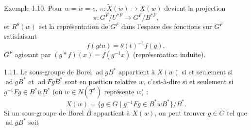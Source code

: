 \documentclass[9pt,twoside]{extarticle}
\begin{document}
{Exemple 1.10. Pour \(w=\dot w=e\), \(\pi:\widetilde X(\dot w)\to X(w)\) devient la projection \[
\pi:G^F/U^{*F}\longrightarrow G^F/B^{*F},
\] et \(R^\theta(w)\) est la représentation de \(G^F\) dans l'espace des fonctions sur \(G^F\) satisfaisant \[
f(gtu)=\theta(t)^{-1}f(g),
\]  \(G^F\) agissant par \((g*f)(x)=f(g^{-1}x)\) (représentation induite).\par

1.11. Le sous-groupe de Borel \(\operatorname{ad}gB^*\) appartient à \(X(w)\) si et seulement si \(\operatorname{ad}gB^*\) et \(\operatorname{ad}FgB^*\) sont en position relative \(w\), c'est-à-dire si et seulement si \(g^{-1}Fg\in B^*\dot wB^*\) (où \(\dot w\in N(T^*)\) représente \(w\)) : \[
\tag{1.11.1}
X(w)=\{g\in G\mid g^{-1}Fg\in B^*\dot wB^*\}/B^*.
\] Si un sous-groupe de Borel \(B\) appartient à \(X(w)\), on peut trouver \(g\in G\) tel que \(\operatorname{ad}gB^*\) soit\par
}
\end{document}
